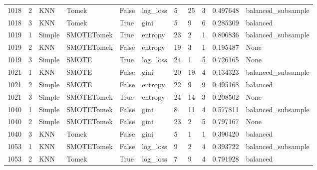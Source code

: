 \documentclass[11pt]{article}
\begin{document}
\begin{table}
\begin{tabularx}{22cm}{lllllllXXXX}
      1018 &       2 &     KNN &      Tomek &  False &  log\_loss &         5 &                    25 &                    3 &      0.497648 & balanced\_subsample \\
      1018 &       3 &     KNN &      Tomek &   True &      gini &         5 &                     9 &                    6 &      0.285309 &           balanced \\
\midrule
      1019 &       1 &  Simple & SMOTETomek &   True &   entropy &        23 &                     2 &                    1 &      0.806836 & balanced\_subsample \\
      1019 &       2 &     KNN & SMOTETomek &  False &   entropy &        19 &                     3 &                    1 &      0.195487 &               None \\
      1019 &       3 &  Simple &      SMOTE &   True &  log\_loss &        24 &                     1 &                    5 &      0.726165 &               None \\
\midrule
      1021 &       1 &     KNN &      SMOTE &  False &      gini &        20 &                    19 &                    4 &      0.134323 & balanced\_subsample \\
      1021 &       2 &  Simple &      SMOTE &  False &   entropy &        22 &                     9 &                    9 &      0.495168 &           balanced \\
      1021 &       3 &  Simple & SMOTETomek &   True &   entropy &        24 &                    14 &                    3 &      0.208502 &               None \\
\midrule
      1040 &       1 &  Simple & SMOTETomek &  False &      gini &         8 &                    11 &                    4 &      0.577811 & balanced\_subsample \\
      1040 &       2 &  Simple & SMOTETomek &  False &      gini &        23 &                     2 &                    5 &      0.797167 &               None \\
      1040 &       3 &     KNN &      Tomek &  False &      gini &         5 &                     1 &                    1 &      0.390420 &           balanced \\
\midrule
      1053 &       1 &     KNN & SMOTETomek &  False &  log\_loss &         9 &                     2 &                    4 &      0.393722 & balanced\_subsample \\
      1053 &       2 &     KNN &      Tomek &   True &  log\_loss &         7 &                     9 &                    4 &      0.791928 &           balanced \\

\end{tabularx}
\end{table}
\end{document}
